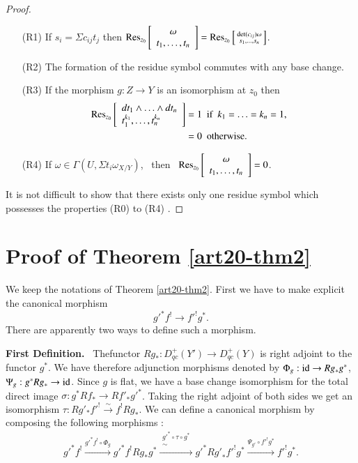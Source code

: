 \begin{proof}
\begin{itemize}
\item[(R1)] If $s_{i}=\Sigma c_{ij}t_{j}$ then $\operatorname{\mathrm{Res}}_{z_{0}}\left[\begin{array}{c} \omega\\ t_{1},\ldots,t_{n}
\end{array}\right]=\operatorname{\mathrm{Res}}_{z_{0}}\left[\begin{smallmatrix} \det(c_{ij})\omega\\ s_{1},\ldots,s_{n}\end{smallmatrix}\right]$.

\item[(R2)] The formation of the residue symbol commutes with any base change.

\item[(R3)] If the morphism $g:Z\to Y$ is an isomorphism at $z_{0}$ then 
\begin{align*}
\operatorname{\mathrm{Res}}_{z_{0}}\left[\begin{array}{l} dt_{1}\wedge\ldots\wedge dt_{n}\\ t^{k_{1}}_{1},\ldots,t^{k_{n}}_{n}\end{array}\right] &= 1\text{~ if~ } k_{1}=\ldots=k_{n}=1,\\
&= 0\text{~ otherwise.}
\end{align*}

\item[(R4)] If $\omega\in \Gamma(U,\Sigma t_{i}\omega_{X/Y})$, \ then \ $\operatorname{\mathrm{Res}}_{z_{0}}\left[\begin{array}{c} \omega\\ t_{1},\ldots,t_{n}\end{array}\right]=0$.
\end{itemize}

It is not difficult to show that there exists only one residue symbol which possesses the properties (R0) to (R4) \cite{art20-key2}.
\end{proof}

\section{Proof of Theorem \ref{art20-thm2}}\label{art20-sec3}

We keep the notations of Theorem \ref{art20-thm2}. First we have to make explicit the canonical morphism
$$
{g'}^{*}f^{!}\to {f'}^{!}g^{*}.
$$
There are apparently two ways to define such a morphism.

\medskip
\noindent
{\bf First Definition.}~ The\pageoriginale functor $Rg_{*}:D^{+}_{qc}(Y')\to D^{+}_{qc}(Y)$ is right adjoint to the functor $g^{*}$. We have therefore adjunction morphisms denoted by $\Phi_{g}:\operatorname{\mathrm{id}}\to Rg_{*}g^{*}$, $\Psi_{g}:g^{*}Rg_{*}\to \operatorname{\mathrm{id}}$. Since $g$ is flat, we have a base change isomorphism for the total direct image $\sigma : g^{*}Rf_{*}\to Rf'_{*}{g'}^{*}$. Taking the right adjoint of both sides we get an isomorphism $\tau : Rg'_{*}{f'}^{!}\xrightarrow{\sim}f^{!}Rg_{*}$. We can define a canonical morphism by composing the following morphisms :
$$
{g'}^{*}f^{!}\xrightarrow{{g'}^{*}f^{!}\circ \Phi_{g}}{g'}^{*}f^{!}Rg_{*}g^{*}\xrightarrow{\substack{{g'}^{*}\circ \tau\circ g^{*}\\ \sim}} {g'}^{*}R{g'}_{*}{f'}^{!}g^{*}\xrightarrow{\Psi_{g'}\circ {f'}^{!}g^{*}}{f'}^{!}g^{*}.
$$

